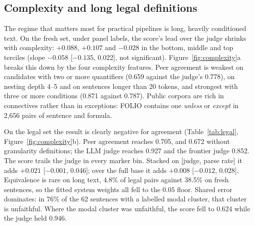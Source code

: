 \documentclass[11pt,letterpaper]{article}
\begin{document}
\subsection{Complexity and long legal definitions}
\label{sec:complexity}

The regime that matters most for practical pipelines is long, heavily conditioned text. On the fresh set, under panel labels, the score's lead over the judge shrinks with complexity: $+0.088$, $+0.107$ and $-0.028$ in the bottom, middle and top terciles (slope $-0.058$ [$-0.135$, 0.022], not significant). Figure~\ref{fig:complexity}a breaks this down by the four complexity features. Peer agreement is weakest on candidates with two or more quantifiers (0.659 against the judge's 0.778), on nesting depth 4--5 and on sentences longer than 20 tokens, and strongest with three or more conditions (0.871 against 0.787). Public corpora are rich in connectives rather than in exceptions: FOLIO contains one \emph{unless} or \emph{except} in 2,656 pairs of sentence and formula.

On the legal set the result is clearly negative for agreement (Table~\ref{tab:legal}, Figure~\ref{fig:complexity}b). Peer agreement reaches 0.705, and 0.672 without granularity definitions; the LLM judge reaches 0.927 and the frontier judge 0.852. The score trails the judge in every marker bin. Stacked on [judge, parse rate] it adds $+0.021$ [$-0.001$, 0.046]; over the full base it adds $+0.008$ [$-0.012$, 0.028]. Equivalence is rare on long text, 4.8\% of legal pairs against 38.5\% on fresh sentences, so the fitted system weights all fell to the 0.05 floor. Shared error dominates: in 76\% of the 62 sentences with a labelled modal cluster, that cluster is unfaithful. Where the modal cluster was unfaithful, the score fell to 0.624 while the judge held 0.946.
\end{document}
